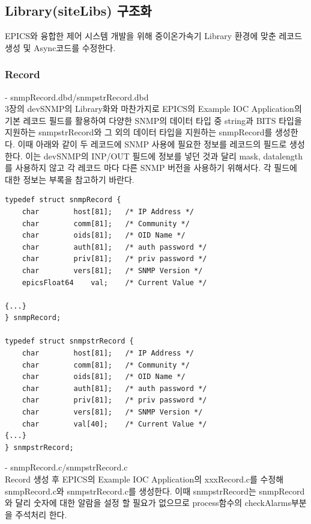 \documentclass[11pt
  , a4paper
  , article
  , oneside
]{memoir}
\begin{document}
\subsection{Library(siteLibs) 구조화}
EPICS와 융합한 제어 시스템 개발을 위해 중이온가속기 Library 환경에 맞춘 레코드 생성 및 Async코드를 수정한다.

\subsubsection{Record}
- snmpRecord.dbd/snmpstrRecord.dbd \\
3장의 devSNMP의 Library화와 마찬가지로 EPICS의 Example IOC Application의 기본 레코드 필드를 활용하여 다양한 SNMP의 데이터 타입 중 string과 BITS 타입을 지원하는 snmpstrRecord와 그 외의 데이터 타입을 지원하는 snmpRecord를 생성한다. 이때 아래와 같이 두 레코드에 SNMP 사용에 필요한 정보를 레코드의 필드로 생성한다. 이는 devSNMP의 INP/OUT 필드에 정보를 넣던 것과 달리 mask, datalength를 사용하지 않고 각 레코드 마다 다른 SNMP 버전을 사용하기 위해서다. 
각 필드에 대한 정보는 부록을 참고하기 바란다.

{\scriptsize
\begin{lstlisting}[style=termstyle]
typedef struct snmpRecord {
	char		host[81];	/* IP Address */
	char		comm[81];	/* Community */
	char		oids[81];	/* OID Name */
	char		auth[81];	/* auth password */
	char		priv[81];	/* priv password */
	char		vers[81];	/* SNMP Version */
	epicsFloat64	val;	/* Current Value */

{...}
} snmpRecord;

typedef struct snmpstrRecord {
	char		host[81];	/* IP Address */
	char		comm[81];	/* Community */
	char		oids[81];	/* OID Name */
	char		auth[81];	/* auth password */
	char		priv[81];	/* priv password */
	char		vers[81];	/* SNMP Version */
	char		val[40];	/* Current Value */
{...}
} snmpstrRecord;
\end{lstlisting}
}

\hfill

- snmpRecord.c/snmpstrRecord.c\\
Record 생성 후 EPICS의 Example IOC Application의 xxxRecord.c를 수정해 snmpRecord.c와 snmpstrRecord.c를 생성한다. 이때 snmpstrRecord는 snmpRecord와 달리 숫자에 대한 알람을 설정 할 필요가 없으므로 process함수의 checkAlarms부분을 주석처리 한다.
\end{document}
